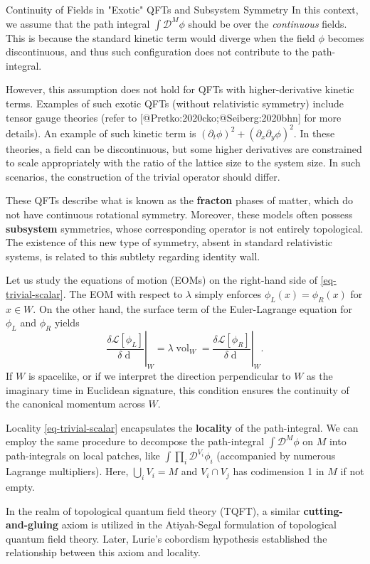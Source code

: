 \documentclass[11pt,toc=bibliography]{scrbook}
\DeclareMathOperator{\vol}{vol}
\numberwithin{equation}{section}
\begin{document}
\begin{note}
{Continuity of Fields in "Exotic" QFTs and Subsystem Symmetry}
In this context, we assume that the path integral $\int\mathcal{D}^M\phi$ should be over the \emph{continuous} fields. This is because the standard kinetic term would diverge when the field $\phi$ becomes discontinuous, and thus such configuration does not contribute to the path-integral. 

However, this assumption does not hold for QFTs with higher-derivative kinetic terms. Examples of such exotic QFTs (without relativistic symmetry) include tensor gauge theories (refer to [@Pretko:2020cko;@Seiberg:2020bhn] for more details). An example of such kinetic term is $(\partial_t\phi)^2 + (\partial_x\partial_y \phi)^2$. In these theories, a field can be discontinuous, but some higher derivatives are constrained to scale appropriately with the ratio of the lattice size to the system size. In such scenarios, the construction of the trivial operator should differ.

These QFTs describe what is known as the \textbf{fracton} phases of matter, which do not have continuous rotational symmetry. Moreover, these models often possess \textbf{subsystem} symmetries, whose corresponding operator is not entirely topological. The existence of this new type of symmetry, absent in standard relativistic systems, is related to this subtlety regarding identity wall.
\end{note}

Let us study the equations of motion (EOMs) on the right-hand side of \eqref{eq-trivial-scalar}. The EOM with respect to $\lambda$ simply enforces $\phi_L(x) = \phi_R(x)$ for $x\in W$. On the other hand, the surface term of the Euler-Lagrange equation for $\phi_L$ and $\phi_R$ yields
\begin{equation}
    \left.\frac{\delta \mathcal{L}[\phi_L]}{\delta \mathop{d\phi_L}}\right|_W = \lambda \vol_W = \left. \frac{\delta \mathcal{L}[\phi_R]}{\delta \mathop{d \phi_R}}\right|_W.
\end{equation}
If $W$ is spacelike, or if we interpret the direction perpendicular to $W$ as the imaginary time in Euclidean signature, this condition ensures the continuity of the canonical momentum across $W$.

\begin{note}
{Locality}
\eqref{eq-trivial-scalar} encapsulates the \textbf{locality} of the path-integral. We can employ the same procedure to decompose the path-integral $\int \mathcal{D}^M{\phi}$ on $M$ into path-integrals on local patches, like $\int \prod_i\mathcal{D}^{V_i}\phi_i$ (accompanied by numerous Lagrange multipliers). Here, $\bigcup_i V_i =M$ and $V_i \cap V_j$ has codimension 1 in $M$ if not empty.

In the realm of topological quantum field theory (TQFT), a similar \textbf{cutting-and-gluing} axiom is utilized in the Atiyah-Segal formulation of topological quantum field theory. Later, Lurie's cobordism hypothesis \cite{Lurie} established the relationship between this axiom and locality.
\end{note}
\end{document}
